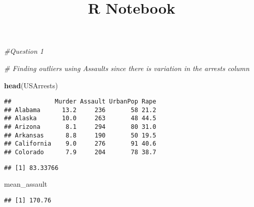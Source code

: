 \documentclass[]{article}
\title{R Notebook}
\author{}
\date{}
\newenvironment{Shaded}{\begin{snugshade}}{\end{snugshade}}
\newcommand{\KeywordTok}[1]{\textcolor[rgb]{0.13,0.29,0.53}{\textbf{#1}}}
\newcommand{\StringTok}[1]{\textcolor[rgb]{0.31,0.60,0.02}{#1}}
\newcommand{\CommentTok}[1]{\textcolor[rgb]{0.56,0.35,0.01}{\textit{#1}}}
\newcommand{\OperatorTok}[1]{\textcolor[rgb]{0.81,0.36,0.00}{\textbf{#1}}}
\newcommand{\NormalTok}[1]{#1}
\begin{document}
\maketitle

\begin{Shaded}
\begin{Highlighting}[]
\CommentTok{#Question 1}

\CommentTok{# Finding outliers using Assaults since there is variation in the arrests column}

\KeywordTok{head}\NormalTok{(USArrests)}
\end{Highlighting}
\end{Shaded}

\begin{verbatim}
##            Murder Assault UrbanPop Rape
## Alabama      13.2     236       58 21.2
## Alaska       10.0     263       48 44.5
## Arizona       8.1     294       80 31.0
## Arkansas      8.8     190       50 19.5
## California    9.0     276       91 40.6
## Colorado      7.9     204       78 38.7
\end{verbatim}

\begin{Shaded}
\end{Shaded}

\begin{verbatim}
## [1] 83.33766
\end{verbatim}

\begin{Shaded}
\begin{Highlighting}[]
\NormalTok{mean_assault}
\end{Highlighting}
\end{Shaded}

\begin{verbatim}
## [1] 170.76
\end{verbatim}

\begin{Shaded}
\end{Shaded}
\end{document}
